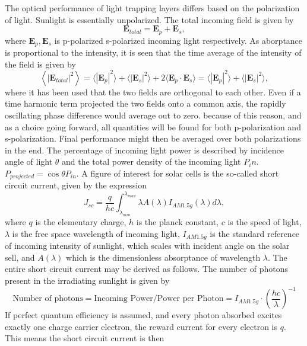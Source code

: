 The optical performance of light trapping layers differs based on the polarization of light. Sunlight is essentially unpolarized. The total incoming field is given by
\begin{equation}
\label{eq:unpolarized}
\mathbf{E}_{total} = \mathbf{E}_p + \mathbf{E}_s,
\end{equation}
where $\mathbf{E}_p,\mathbf{E}_s$ is p-polarized s-polarized incoming light respectively. As aborptance is proportional to the intensity, it is seen
that the time average of the intensity of the field is given by
\begin{equation}
\label{eq:average}
\left<|\mathbf{E}_{total}|^2\right> = \langle |\mathbf{E}_{p}|^2 \rangle + \langle |\mathbf{E}_{s}|^2 \rangle + 2\langle \mathbf{E}_{p} \cdot \mathbf{E}_{s} \rangle = \langle |\mathbf{E}_{p}|^2 \rangle + \langle |\mathbf{E}_{s}|^2 \rangle,
\end{equation}
where it has been used that the two fields are orthogonal to each other. Even if a time harmonic term projected the two fields onto a common axis, the rapidly oscillating phase difference would average out to zero.
because of this reason, and as a choice going forward, all quantities will be found for both p-polarization and s-polarization. Final performance might then be averaged over both polarizations in the end.
The percentage of incoming light power is described by incidence angle of light $\theta$ and the total power density of the incoming light $P_in$.
$P_{projected} = \cos{\theta} P_{in}$.
A figure of interest for solar cells is the so-called short circuit current, given by the expression
\begin{equation}
\label{eq:shortcircuitcurrent}
J_{sc} = \frac{q}{hc}\int_{\lambda_{min}}^{\lambda_{max}}\lambda A(\lambda)I_{AM1.5g}(\lambda) d\lambda,
\end{equation}
where $q$ is the elementary charge, $h$ is the planck constant, $c$ is the speed of light, $\lambda$ is the free space wavelength of incoming light, $I_{AM1.5g}$ is the standard reference of incoming intensity of sunlight, which scales with incident angle on the solar sell, and 
$A(\lambda)$ which is the dimensionless absorptance of wavelength $\lambda$. The entire short circuit current may be derived as follows. The number of photons present in the irradiating sunlight is given by
$$
\text{Number of photons} = \text{Incoming Power} / \text{Power per Photon} = I_{AM1.5g} \cdot \left(\frac{hc}{\lambda}\right)^{-1}
$$
If perfect quantum efficiency is assumed, and every photon absorbed excites exactly one charge carrier electron, the reward current for every electron is $q$. This means the short circuit current is then
